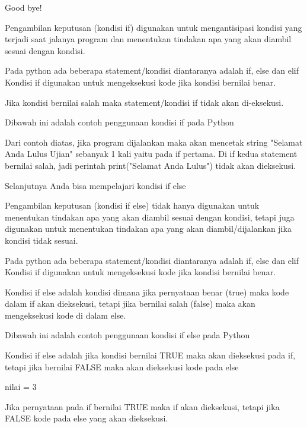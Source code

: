  
Good bye! \hspace*{1.31in}  
 

 
Pengambilan keputusan (kondisi if) digunakan untuk mengantisipasi kondisi yang terjadi saat jalanya program dan menentukan tindakan apa yang akan diambil sesuai dengan kondisi. 
 

 
Pada python ada beberapa statement/kondisi diantaranya adalah   if,   else   dan   elif   Kondisi   if   digunakan untuk mengeksekusi kode jika kondisi bernilai benar. 
 

 
Jika kondisi bernilai salah maka statement/kondisi if tidak akan di-eksekusi. 
 

Dibawah ini adalah contoh penggunaan kondisi if pada Python 
 

Dari contoh diatas, jika program dijalankan maka akan mencetak string "Selamat Anda Lulus Ujian" sebanyak 1 kali yaitu pada if pertama. Di if kedua statement bernilai salah, jadi perintah   print("Selamat Anda Lulus")   tidak akan dieksekusi. 
 

Selanjutnya Anda bisa mempelajari kondisi if else 

 
Pengambilan keputusan (kondisi if else) tidak hanya digunakan untuk menentukan tindakan apa yang akan diambil sesuai dengan kondisi, tetapi juga digunakan untuk menentukan tindakan apa yang akan diambil/dijalankan jika kondisi tidak sesuai.

 
 
Pada python ada beberapa statement/kondisi diantaranya adalah   if,   else   dan   elif   Kondisi   if   digunakan untuk mengeksekusi kode jika kondisi bernilai benar.

 
 
Kondisi if else adalah kondisi dimana jika pernyataan benar (true) maka kode dalam if akan dieksekusi, tetapi jika bernilai salah (false) maka akan mengeksekusi kode di dalam else.

 
 
Dibawah ini adalah contoh penggunaan kondisi if else pada Python 

 
Kondisi if else adalah jika kondisi bernilai TRUE maka akan dieksekusi pada if, tetapi jika bernilai FALSE maka akan dieksekusi kode pada else 
 

nilai = 3
 
 
Jika pernyataan pada if bernilai TRUE maka if akan dieksekusi, tetapi jika FALSE kode pada else yang akan dieksekusi.
 
